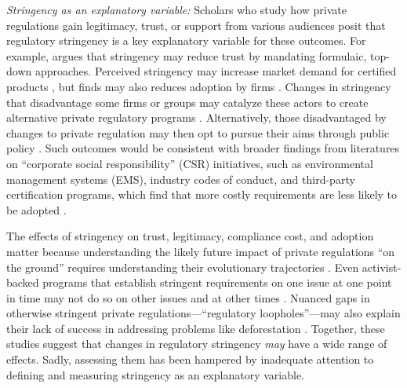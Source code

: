 \documentclass[
      12pt,
            Review ]{article}
\begin{document}
\emph{Stringency as an explanatory variable:} Scholars who study how
private regulations gain legitimacy, trust, or support from various
audiences posit that regulatory stringency is a key explanatory variable
for these outcomes. For example, \citet{McDermott2012} argues that
stringency may reduce trust by mandating formulaic, top-down approaches.
Perceived stringency may increase market demand for certified products
\citep{Atkinson2014}, but finds may also reduces adoption by firms
\citep{Prado2013}. Changes in stringency that disadvantage some firms or
groups may catalyze these actors to create alternative private
regulatory programs \citep{Meidinger2003}. Alternatively, those
disadvantaged by changes to private regulation may then opt to pursue
their aims through public policy \citep{Weimer2006}. Such outcomes would
be consistent with broader findings from literatures on ``corporate
social responsibility'' (CSR) initiatives, such as environmental
management systems (EMS), industry codes of conduct, and third-party
certification programs, which find that more costly requirements are
less likely to be adopted \citep{Delmas2008, Kollman2001, Lyon2008}.

The effects of stringency on trust, legitimacy, compliance cost, and
adoption matter because understanding the likely future impact of
private regulations ``on the ground'' requires understanding their
evolutionary trajectories \citep{VanderVen2018}. Even activist-backed
programs that establish stringent requirements on one issue at one point
in time may not do so on other issues and at other times
\citep{LeBaron2018}. Nuanced gaps in otherwise stringent private
regulations---``regulatory loopholes''---may also explain their lack of
success in addressing problems like deforestation \citep{VanderVen2018}.
Together, these studies suggest that changes in regulatory stringency
\emph{may} have a wide range of effects. Sadly, assessing them has been
hampered by inadequate attention to defining and measuring stringency as
an explanatory variable.
\end{document}
